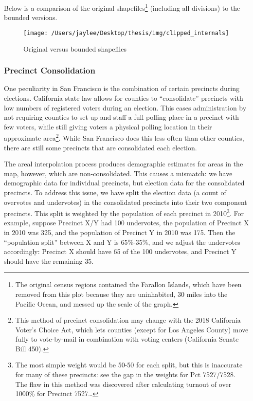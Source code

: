 \documentclass[12pt,twoside]{reedthesis}
\begin{document}
Below is a comparison of the original shapefiles\footnote{The original census regions contained the Farallon Islands, which have been removed from this plot because they are uninhabited, 30 miles into the Pacific Ocean, and messed up the scale of the graph.} (including all divisions) to the bounded versions.
\begin{figure}
\texttt{[image: /Users/jaylee/Desktop/thesis/img/clipped\_internals]} \caption{Original versus bounded shapefiles}\label{fig:unnamed-chunk-7}
\end{figure}
\hypertarget{precinct-consolidation}{%
\subsubsection{Precinct Consolidation}\label{precinct-consolidation}}

One peculiarity in San Francisco is the combination of certain precincts during elections. California state law allows for counties to ``consolidate'' precincts with low numbers of registered voters during an election. This eases administration by not requiring counties to set up and staff a full polling place in a precinct with few voters, while still giving voters a physical polling location in their approximate area\footnote{This method of precinct consolidation may change with the 2018 California Voter's Choice Act, which lets counties (except for Los Angeles County) move fully to vote-by-mail in combination with voting centers (California Senate Bill 450).}. While San Francisco does this less often than other counties, there are still some precincts that are consolidated each election.

The areal interpolation process produces demographic estimates for areas in the map, however, which are non-consolidated. This causes a mismatch: we have demographic data for individual precincts, but election data for the consolidated precincts. To address this issue, we have split the election data (a count of overvotes and undervotes) in the consolidated precincts into their two component precincts. This split is weighted by the population of each precinct in 2010\footnote{The most simple weight would be 50-50 for each split, but this is inaccurate for many of these precincts: see the gap in the weights for Pct 7527/7528. The flaw in this method was discovered after calculating turnout of over 1000\% for Precinct 7527\ldots{}}. For example, suppose Precinct X/Y had 100 undervotes, the population of Precinct X in 2010 was 325, and the population of Precinct Y in 2010 was 175. Then the ``population split'' between X and Y is 65\%-35\%, and we adjust the undervotes accordingly: Precinct X should have 65 of the 100 undervotes, and Precinct Y should have the remaining 35.
\end{document}
